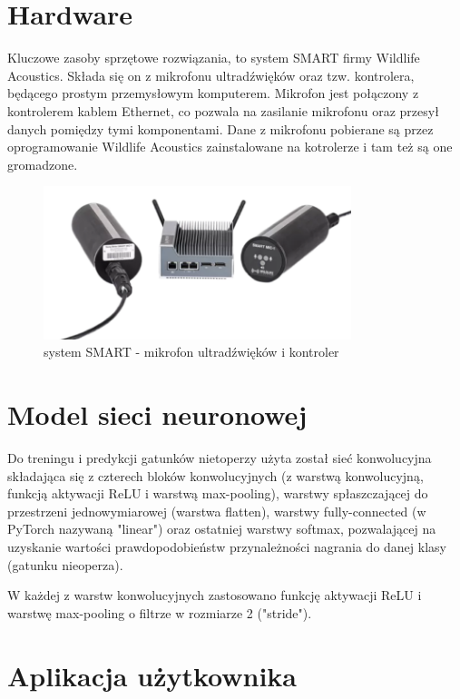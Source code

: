 \documentclass{sprz}
\begin{document}
\section{Hardware}
Kluczowe zasoby sprzętowe rozwiązania, to system SMART firmy Wildlife Acoustics. Składa się on z mikrofonu ultradźwięków oraz tzw. kontrolera, będącego prostym przemysłowym komputerem. Mikrofon jest połączony z kontrolerem kablem Ethernet, co pozwala na zasilanie mikrofonu oraz przesył danych pomiędzy tymi komponentami. Dane z mikrofonu pobierane są przez oprogramowanie Wildlife Acoustics zainstalowane na kotrolerze i tam też są one gromadzone.
\clearpage

\begin{figure}[h]
  \centering
  \includegraphics[width=0.8\textwidth]{sprz/smart2}
  \caption{system SMART - mikrofon ultradźwięków i kontroler}
  \label{img:smart2}
\end{figure}

\section{Model sieci neuronowej}
Do treningu i predykcji gatunków nietoperzy użyta został sieć konwolucyjna składająca się z czterech bloków konwolucyjnych (z warstwą konwolucyjną, funkcją aktywacji ReLU i warstwą max-pooling), warstwy spłaszczającej do przestrzeni jednowymiarowej (warstwa flatten), warstwy fully-connected (w PyTorch nazywaną "linear") oraz ostatniej warstwy softmax, pozwalającej na uzyskanie wartości prawdopodobieństw przynależności nagrania do danej klasy (gatunku nieoperza).

W każdej z warstw konwolucyjnych zastosowano funkcję aktywacji ReLU i warstwę max-pooling o filtrze w rozmiarze 2 ("stride").
\clearpage

\section{Aplikacja użytkownika}
\end{document}
